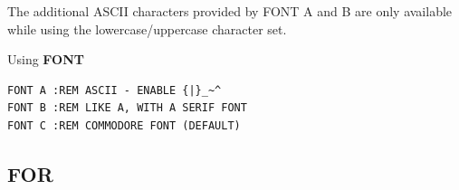 \begin{description}[leftmargin=2cm,style=nextline]
\item [Remarks:] The additional ASCII characters provided by FONT A and B are only available
  while using the lowercase/uppercase character set.

\item [Examples:] Using {\bf FONT}
\begin{tcolorbox}[colback=black,coltext=white]
\begin{verbatim}
FONT A :REM ASCII - ENABLE {|}_~^
FONT B :REM LIKE A, WITH A SERIF FONT
FONT C :REM COMMODORE FONT (DEFAULT)
\end{verbatim}
\end{tcolorbox}
\end{description}


\newpage
\subsection{FOR}
